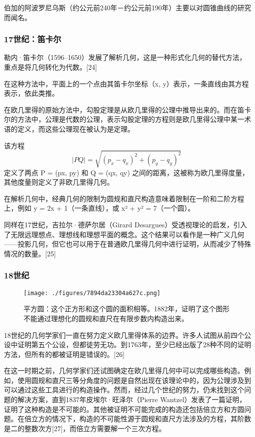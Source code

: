伯加的阿波罗尼乌斯（约公元前240年－约公元前190年）主要以对圆锥曲线的研究而闻名。
\subsubsection{17世纪：笛卡尔} 
勒内·笛卡尔（1596–1650）发展了解析几何，这是一种形式化几何的替代方法，重点是将几何转化为代数。[24]

在这种方法中，平面上的一个点由其笛卡尔坐标（x, y）表示，一条直线由其方程表示，依此类推。

在欧几里得的原始方法中，勾股定理是从欧几里得的公理中推导出来的。而在笛卡尔的方法中，公理是代数的公理，表示勾股定理的方程则是欧几里得公理中某一术语的定义，而这些公理现在被认为是定理。

该方程
\[
|PQ| = \sqrt{(p_x - q_x)^2 + (p_y - q_y)^2}~
\]
定义了两点 P = (px, py) 和 Q = (qx, qy) 之间的距离，这被称为欧几里得度量，其他度量则定义了非欧几里得几何。

在解析几何中，经典几何的限制为圆规和直尺构造意味着限制在一阶和二阶方程上，例如 y = 2x + 1（一条直线），或 x² + y² = 7（一个圆）。

同样在17世纪，吉拉尔·德萨尔居（Girard Desargues）受透视理论的启发，引入了无限远理想点、理想线和理想平面的概念。这个结果可以看作是一种广义几何——投影几何，但它也可以用于在普通欧几里得几何中进行证明，从而减少了特殊情况的数量。[25]
\subsubsection{18世纪}  
\begin{figure}[ht]
\centering
\texttt{[image: ./figures/7894da23304a627c.png]}
\caption{平方圆：这个正方形和这个圆的面积相等。1882年，证明了这个图形不能通过理想化的圆规和直尺在有限步数内构造出来。} \label{fig_OJLJH_25}
\end{figure}
18世纪的几何学家们一直在努力定义欧几里得体系的边界。许多人试图从前四个公设中证明第五个公设，但都徒劳无功。到1763年，至少已经出版了28种不同的证明方法，但所有的都被证明是错误的。[26]

在这一时期之前，几何学家们还试图确定在欧几里得几何中可以完成哪些构造。例如，使用圆规和直尺三等分角度的问题是自然出现在该理论中的，因为公理涉及到可以通过这些工具进行的构造操作。然而，经过几个世纪的努力，仍未找到这个问题的解决方案，直到1837年皮埃尔·旺泽尔（Pierre Wantzel）发表了一篇证明，证明了这种构造是不可能的。其他被证明不可能完成的构造还包括倍立方和方圆问题。在倍立方的情况下，构造的不可能性源于圆规和直尺方法涉及的方程，其阶数是二的整数次方[27]，而倍立方需要解一个三次方程。

